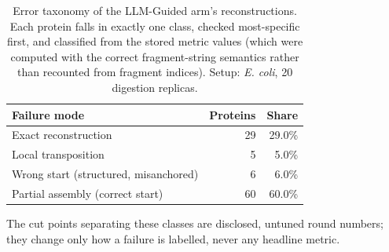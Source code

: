 \begin{table}[!tb]
  \centering
  \caption{Error taxonomy of the LLM-Guided arm's reconstructions. Each protein falls in exactly one class, checked most-specific first, and classified from the stored metric values (which were computed with the correct fragment-string semantics rather than recounted from fragment indices). Setup: \textnormal{\textnormal{\textit{E. coli}}}, 20 digestion replicas.}
  \label{tab:error_taxonomy_ecoli_r20}
  \begin{tabular}{lrr}
    \toprule
    Failure mode & Proteins & Share \\
    \midrule
    Exact reconstruction & 29 & 29.0\% \\
    Local transposition & 5 & 5.0\% \\
    Wrong start (structured, misanchored) & 6 & 6.0\% \\
    Partial assembly (correct start) & 60 & 60.0\% \\
    \bottomrule
  \end{tabular}
  \par\smallskip\footnotesize{The cut points separating these classes are disclosed, untuned round numbers; they change only how a failure is labelled, never any headline metric.}
\end{table}
